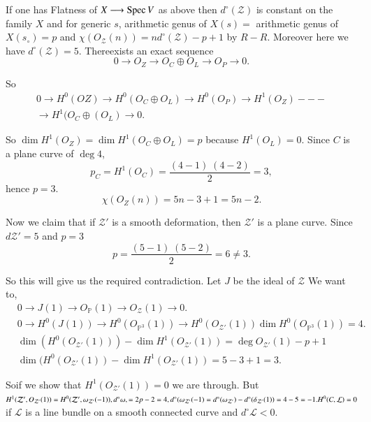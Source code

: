 \begin{example*}
If one has Flatness of $X\longrightarrow\operatorname{Spec} V$ as above then
$d^\circ(\mathcal{Z})$ is constant on the family $X$ and for generic
$s$, arithmetic genus of $X(s)=$ arithmetic genus of $X(s_\circ)=p$
and $\chi(O_{\mathcal{Z}}(n))=nd^\circ(\mathcal{Z})-p+1$ by
$R-R$. Moreover here we have
$d^\circ(\mathcal{Z})=5$. There\pageoriginale exists an exact sequence
$$
0\longrightarrow O_Z\longrightarrow O_C\oplus O_L\longrightarrow O_P
\longrightarrow 0.
$$

So
\begin{gather*}
0\longrightarrow H^0(OZ)\longrightarrow H^0(O_C\oplus O_L)
\longrightarrow H^0(O_P)\longrightarrow H^1(O_Z)---\\
\longrightarrow H^1(O_C\oplus(O_L)\longrightarrow 0.
\end{gather*}

So $\dim H^1(O_Z)=\dim H^1(O_C\oplus O_L)=p$ because
$H^1(O_L)=0$. Since $C$ is a plane curve of $\deg 4$,
$$
p_C=H^1(O_C)=\frac{(4-1)\;(4-2)}{2}=3,
$$
hence $p=3$. 
$$
\chi(O_Z(n))=5n-3+1=5n-2.
$$

Now we claim that if $\mathcal{Z}'$ is a smooth deformation, then
$\mathcal{Z}'$ is a plane curve. Since $d\mathcal{Z}'=5$ and $p=3$
$$
p=\frac{(5-1)\;(5-2)}{2}=6\neq 3.
$$

So this will give us the required contradiction. Let $J$ be the ideal
of $\mathcal{Z}$ We want to,
\begin{align*}
& 0\longrightarrow J(1)\longrightarrow
O_{\mathbb{P}}(1)\longrightarrow O_{\mathcal{Z}}(1)\longrightarrow
0.\\ 
& 0\longrightarrow H^0(J(1))\longrightarrow H^0(O_{\mathbb{P}^3}(1))
\longrightarrow H^0(O_{\mathcal{Z}'}(1)) \dim
H^0(O_{\mathbb{P}^3}(1))=4.\\
&\dim(H^0(O_{\mathcal{Z}'}(1)))-\dim H^1(O_{\mathcal{Z}'}(1))=\deg
O_{\mathcal{Z}'}(1)-p+1\\
&\dim(H^0(O_{\mathcal{Z}'}(1))-\dim H^1(O_{\mathcal{Z}'}(1))=5-3+1=3.
\end{align*}

So\pageoriginale if we show that $H^1(O_{\mathcal{Z}'}(1))=0$ we are
through. But $H^1(\mathcal{Z}',\break O_{\mathcal{Z}'}(1))=H^0(\mathcal{Z}',
\omega_{\mathcal{Z}'}(-1)),d^\circ\omega,=2p-2=4,
d^\circ(\omega_{\mathcal{Z}'}(-1)=d^\circ(\omega_{\mathcal{Z}'})-d^\circ
(\delta_{\mathcal{Z}'}(1))=4-5=-1. H^0(C,\mathcal{L})=0$ if
$\mathcal{L}$ is a line bundle on a smooth connected curve and
$d^\circ\mathcal{L} <0$. 
\end{example*}

